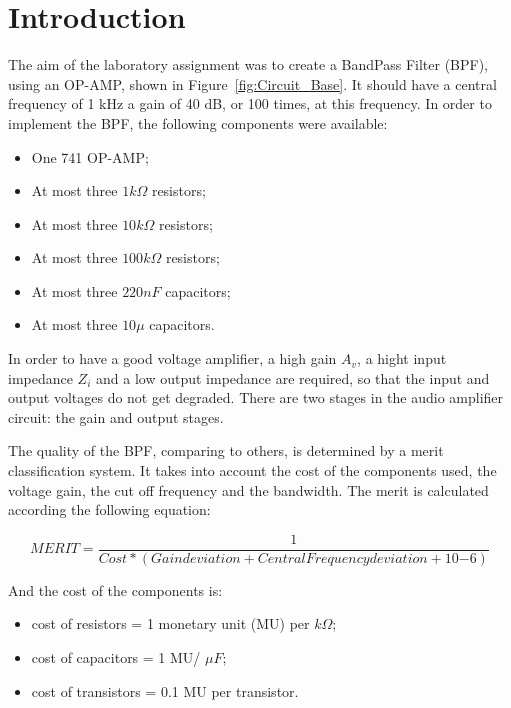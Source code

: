 \section{Introduction}
\label{sec:introduction}

The aim of the laboratory assignment was to create a BandPass Filter (BPF), using an OP-AMP, shown in Figure~\ref{fig:Circuit_Base}. It should have a central frequency of 1 kHz a gain of 40 dB, or 100 times, at this frequency. In order to implement the BPF, the following components were available:

\begin{itemize}
	\item One 741 OP-AMP;
    \item At most three $1k \Omega$ resistors;
    \item At most three $10k \Omega$ resistors;
    \item At most three $100k \Omega$ resistors;
    \item At most three $220nF$ capacitors;
    \item At most three $10 \mu$ capacitors.
\end{itemize}


In order to have a good voltage amplifier, a high gain $A_v$, a hight input impedance $Z_i$ and a low output impedance are required, so that the input and output voltages do not get degraded. There are two stages in the audio amplifier circuit: the gain and output stages. 

The quality of the BPF, comparing to others, is determined by a merit classification system. It takes into account the cost of the components used, the voltage gain, the cut off frequency and the bandwidth. The merit is calculated according the following equation:

\begin{equation}
	MERIT = \frac {1}{Cost * (Gain deviation + Central Frequency deviation + 10{-6} )}
	\label{eq:i1}
\end{equation}

And the cost of the components is: 

\begin{itemize}
	\item cost of resistors = 1 monetary unit (MU) per $k \Omega$;
    \item cost of capacitors = 1 MU/ $\mu F$;
    \item cost of transistors = 0.1 MU per transistor.
\end{itemize}

